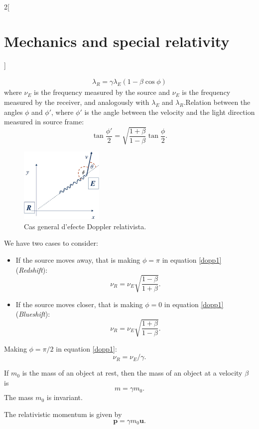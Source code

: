\documentclass[class=article,10pt,crop=false]{standalone}
\begin{document}
\begin{multicols}{2}[\section{Mechanics and special relativity}]
\begin{concept}
\begin{gather}
    \lambda_R=\gamma\lambda_E(1-\beta\cos\phi)
\end{gather} where $\nu_E$ is the frequency measured by the source and $\nu_E$ is the frequency measured by the receiver, and analogously with $\lambda_E$ and $\lambda_R$.\newline Relation between the angles $\phi$ and $\phi'$, where $\phi'$ is the angle between the velocity and the light direction measured in source frame: 
$$\tan\frac{\phi'}{2}=\sqrt{\frac{1+\beta}{1-\beta}}\tan\frac{\phi}{2}.$$
\end{concept}
\begin{figure}[ht]
    \centering
    \includegraphics[width=4cm]{Physics/1st/Mechanics_and_special_relativity/Images/dop.jpg}
    \caption{Cas general d'efecte Doppler relativista.}
\end{figure}
\begin{concept}
We have two cases to consider:
\begin{itemize}
    \item If the source moves away, that is making $\phi=\pi$ in equation \eqref{dopp1} (\textit{Redshift}):
   $$\nu_R=\nu_E\sqrt{\frac{1-\beta}{1+\beta}}.$$
    \item If the source moves closer, that is making $\phi=0$ in equation \eqref{dopp1} (\textit{Blueshift}):
   $$\nu_R=\nu_E\sqrt{\frac{1+\beta}{1-\beta}}.$$
\end{itemize}
\end{concept}
\begin{concept}
Making $\phi=\pi/2$ in equation \eqref{dopp1}:$$\nu_R=\nu_E/\gamma.$$
\end{concept}
\begin{concept}
If $m_0$ is the mass of an object at rest, then the mass of an object at a velocity $\beta$ is $$m=\gamma m_0.$$ The mass $m_0$ is invariant.
\end{concept}
\begin{concept}
The relativistic momentum is given by $$\boldsymbol{p}=\gamma m_0\boldsymbol{u}.$$
\end{concept}

\end{multicols}
\end{document}
